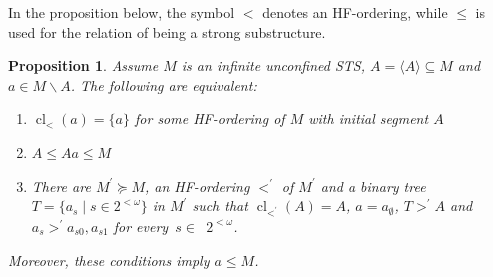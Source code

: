 \documentclass[a4paper, 11pt]{article}
\DeclareMathOperator{\cl}{cl}
\theoremstyle{note}
\newtheorem{prop}[thm]{Proposition}
\begin{document}
 In the proposition below, the symbol $<$ denotes an HF-ordering, while $\leq$ is used for the relation of being a strong substructure.
\begin{prop} \label{May_26_2024_1} Assume  $M$ is an infinite unconfined STS, $A=\langle A\rangle \subseteq  M$  and  $a\in M\smallsetminus A$. The following are equivalent:
	\begin{enumerate}
		\item  $\cl_<(a)=\{a\}$ for some HF-ordering of $M$ with initial segment  $A$
		\item   $A\leq Aa\leq M$
		\item There are $M^\prime\succeq M$, an HF-ordering $<^\prime$ of $M^\prime$ and a binary tree $T=\{a_s\mid s\in 2^{<\omega}\}$ in $M^\prime$ such that $\cl_{<^\prime}(A)=A$,  $a=a_\emptyset$, $T>^\prime A$ and  $a_s>^\prime a_{s0},a_{s1}$ for every~$s\in$~$ 2^{<\omega}$.
	\end{enumerate}
	Moreover, these conditions imply $a\leq M$.
\end{prop}
\end{document}
